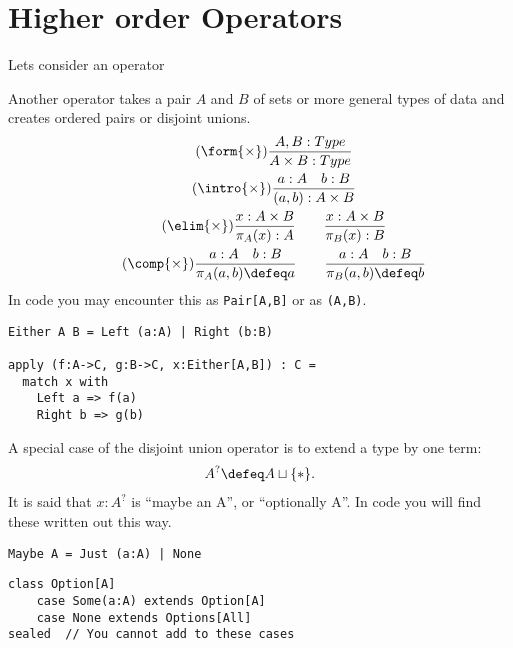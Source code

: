 
\section{Higher order Operators}
Lets consider an operator 

Another operator takes a pair $A$ and $B$ of sets or more general types 
of data and creates ordered pairs or disjoint unions.
\begin{gather}
    \tag{$\form{\times}$}
    \frac{A,B:Type}{A\times B:Type}\\
    \tag{$\intro{\times}$}
    \frac{a:A\quad b:B}{(a,b):A\times B}\\
    \tag{$\elim{\times}$}
    \frac{x:A\times B}{\pi_A(x):A}\qquad 
    \frac{x:A\times B}{\pi_B(x):B}\\
    \tag{$\comp{\times}$}
    \frac{a:A\quad b:B}{\pi_A(a,b)\defeq a}
    \qquad
    \frac{a:A\quad b:B}{\pi_B(a,b)\defeq b}
\end{gather}
In code you may encounter this as \lstinline{Pair[A,B]} or 
as \lstinline{(A,B)}.

\begin{lstlisting}[language=Hidris]
Either A B = Left (a:A) | Right (b:B)

apply (f:A->C, g:B->C, x:Either[A,B]) : C =
  match x with 
    Left a => f(a)
    Right b => g(b)
\end{lstlisting}
A special case of the disjoint union operator is to extend a type by 
one term:
\begin{align*}
    A^? \defeq A\sqcup \{*\}.
\end{align*}
It is said that $x:A^?$ is ``maybe an A'', or ``optionally A''.
In code you will find these written out this way.
\begin{lstlisting}[language=Hidris]
Maybe A = Just (a:A) | None
\end{lstlisting}
\begin{lstlisting}[language=Sava]
class Option[A]
    case Some(a:A) extends Option[A]
    case None extends Options[All]    
sealed  // You cannot add to these cases
\end{lstlisting}